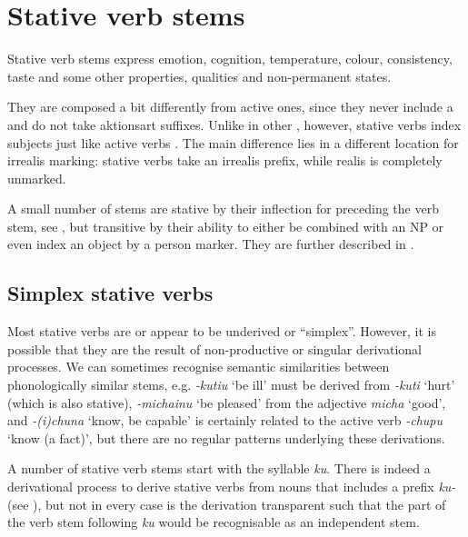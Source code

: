 \section{Stative verb stems}\label{sec:StativeVerbs}

Stative verb stems express emotion, cognition, temperature, colour, consistency, taste and some other properties, qualities and non-permanent states. 

They are composed a bit differently from active ones, since they never include a  and do not take aktionsart suffixes. Unlike in other , however, stative verbs index subjects just like active verbs \citep[cf.][]{Danielsen_Granadillo2008}. The main difference lies in a different location for irrealis marking: stative verbs take an irrealis prefix, while realis is completely unmarked.

A small number of stems are stative by their inflection for  preceding the verb stem, see , but transitive by their ability to either be combined with an  NP or even index an object by a person marker. They are further described in .


\subsection{Simplex stative verbs}\label{sec:SimpleStativeVerbs}

Most stative verbs are or appear to be underived or “simplex”. However, it is possible that they are the result of non-productive or singular derivational processes. We can sometimes recognise semantic similarities between phonologically similar stems, e.g. \textit{-kutiu} ‘be ill’ must be derived from \textit{-kuti} ‘hurt’ (which is also stative), \textit{-michainu} ‘be pleased’ from the adjective \textit{micha} ‘good’, and \textit{-(i)chuna} ‘know, be capable’ is certainly related to the active verb \textit{-chupu} ‘know (a fact)’, but there are no regular patterns underlying these derivations.

A number of stative verb stems start with the syllable \textit{ku}. There is indeed a derivational process to derive stative verbs from nouns that includes a prefix \textit{ku-} (see ), but not in every case is the derivation transparent such that the part of the verb stem following \textit{ku} would be recognisable as an independent stem.


